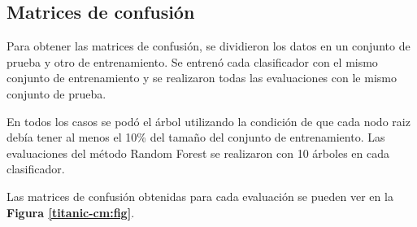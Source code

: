 \documentclass[a4paper]{article}
\newcommand{\reffig}[1]{\textbf{Figura \ref{#1}}}
\begin{document}
  \subsection{Matrices de confusión}
  Para obtener las matrices de confusión, se dividieron los datos en un conjunto de prueba y otro de entrenamiento. Se entrenó cada clasificador con el mismo conjunto de entrenamiento y se realizaron todas las evaluaciones con le mismo conjunto de prueba.
  
  En todos los casos se podó el árbol utilizando la condición de que cada nodo raiz debía tener al menos el 10\% del tamaño del conjunto de entrenamiento. Las evaluaciones del método Random Forest se realizaron con 10 árboles en cada clasificador.

  Las matrices de confusión obtenidas para cada evaluación se pueden ver en la \reffig{titanic-cm:fig}.
\end{document}
